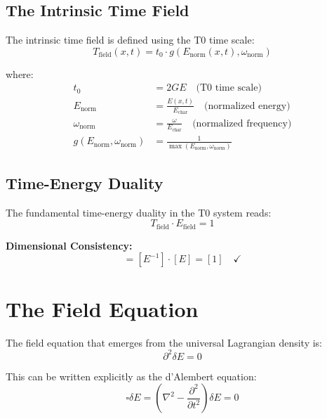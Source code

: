 \documentclass[12pt,a4paper]{report}
\newcommand{\tzero}{t_0}                  %
\begin{document}
	\subsection{The Intrinsic Time Field}\label{subsec:time_field_definition}
	
	The intrinsic time field is defined using the T0 time scale:
	\begin{equation}
		\boxed{T_{\text{field}}(x,t) = \tzero \cdot g(E_{\text{norm}}(x,t), \omega_{\text{norm}})}
		\label{eq:time_field_normalized}
	\end{equation}
	
	where:
	\begin{align}
		\tzero &= 2GE \quad \text{(T0 time scale)} \\
		E_{\text{norm}} &= \frac{E(x,t)}{E_{\text{char}}} \quad \text{(normalized energy)} \\
		\omega_{\text{norm}} &= \frac{\omega}{E_{\text{char}}} \quad \text{(normalized frequency)} \\
		g(E_{\text{norm}}, \omega_{\text{norm}}) &= \frac{1}{\max(E_{\text{norm}}, \omega_{\text{norm}})}
	\end{align}
	
	\subsection{Time-Energy Duality}
	
	The fundamental time-energy duality in the T0 system reads:
	\begin{equation}
		\boxed{T_{\text{field}} \cdot E_{\text{field}} = 1}
		\label{eq:time_energy_duality}
	\end{equation}
	
	\textbf{Dimensional Consistency:}
	\begin{equation}
		[T_{\text{field}} \cdot E_{\text{field}}] = [E^{-1}] \cdot [E] = [1] \quad \checkmark
	\end{equation}
	
	\section{The Field Equation}
	
	The field equation that emerges from the universal Lagrangian density is:
	\begin{equation}
		\boxed{\partial^2 \delta E = 0}
		\label{eq:field_equation}
	\end{equation}
	
	This can be written explicitly as the d'Alembert equation:
	\begin{equation}
		\square \delta E = \left(\nabla^2 - \frac{\partial^2}{\partial t^2}\right) \delta E = 0
	\end{equation}
	
\end{document}
